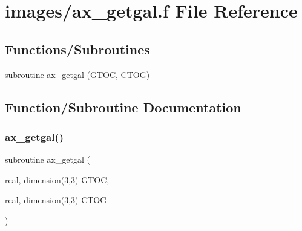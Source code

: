 \hypertarget{ax__getgal_8f}{}\section{images/ax\+\_\+getgal.f File Reference}
\label{ax__getgal_8f}
\subsection*{Functions/\+Subroutines}
\begin{DoxyCompactItemize}
\item 
subroutine \hyperlink{ax__getgal_8f_a0a751ff4c583969ebf68974b92412008}{ax\+\_\+getgal} (G\+T\+OC, C\+T\+OG)
\end{DoxyCompactItemize}


\subsection{Function/\+Subroutine Documentation}
\mbox{\label{ax__getgal_8f_a0a751ff4c583969ebf68974b92412008}} 
\subsubsection{\texorpdfstring{ax\+\_\+getgal()}{ax\_getgal()}}
{\footnotesize\ttfamily subroutine ax\+\_\+getgal (\begin{DoxyParamCaption}\item[{real, dimension(3,3)}]{G\+T\+OC,  }\item[{real, dimension(3,3)}]{C\+T\+OG }\end{DoxyParamCaption})}

